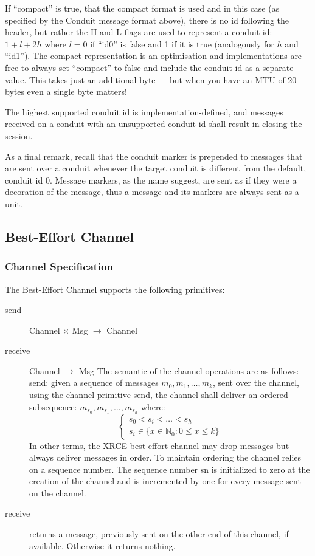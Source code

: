 \documentclass[a4paper,oneside,article]{memoir}
\begin{document}
If ``compact'' is true, that the compact format is used and in this case (as specified by the
Conduit message format above), there is no id following the header, but rather the H and L flags are
used to represent a conduit id: $1 + l + 2h$ where $l = 0$ if ``id0'' is false and 1 if it is true
(analogously for $h$ and ``id1'').  The compact representation is an optimisation and
implementations are free to always set ``compact'' to false and include the conduit id as a separate
value.  This takes just an additional byte --- but when you have an MTU of 20 bytes even a single
byte matters!

The highest supported conduit id is implementation-defined, and messages received on a conduit with
an unsupported conduit id shall result in closing the session.

As a final remark, recall that the conduit marker is prepended to messages that are sent over a
conduit whenever the target conduit is different from the default, conduit id 0.  Message markers,
as the name suggest, are sent as if they were a decoration of the message, thus a message and its
markers are always sent as a unit.

\subsection{Best-Effort Channel}

\subsubsection{Channel Specification}

The Best-Effort Channel supports the following primitives:
\begin{description}
\item[send] Channel $\times$ Msg $\rightarrow$ Channel
\item[receive] Channel $\rightarrow$ Msg The semantic of the channel operations are as follows:
  send: given a sequence of messages $m_0, m_1, \ldots{}, m_k$, sent over the channel, using the
  channel primitive send, the channel shall deliver an ordered subsequence:
  $m_{s_0},m_{s_1}, \ldots{} ,m_{s_h}$ where:
  \[
    \left.
      \begin{cases}
        s_0 < s_i < \ldots{} < s_h \\
        s_i \in \{ x \in \mathbb{N}_0 : 0 \leq x \leq k \}
      \end{cases}
    \right.
  \]
  In other terms, the XRCE best-effort channel may drop messages but always deliver messages in
  order. To maintain ordering the channel relies on a sequence number. The sequence number sn is
  initialized to zero at the creation of the channel and is incremented by one for every message
  sent on the channel.
\item[receive] returns a message, previously sent on the other end of this channel, if
  available. Otherwise it returns nothing.
\end{description}
\end{document}
